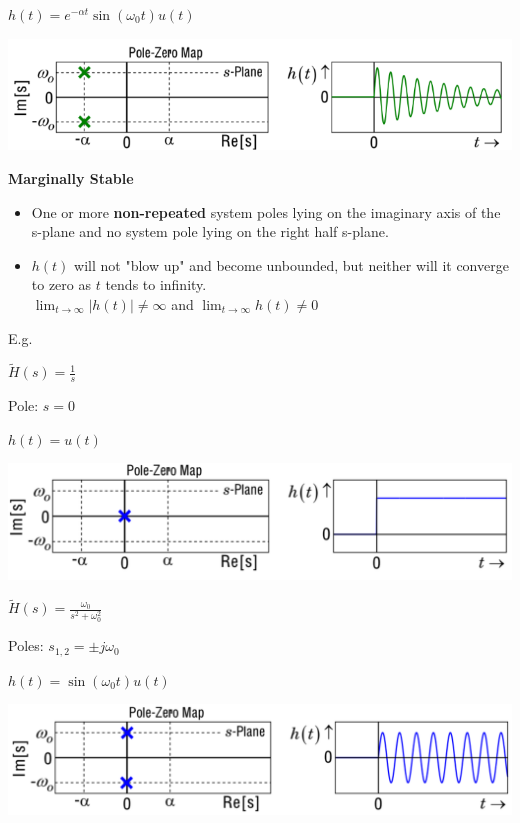 \documentclass[landscape,a4paper]{extarticle}
\newenvironment{Figure}
  {\par\medskip\noindent\minipage{\linewidth}}
  {\endminipage\par\medskip}
\begin{document}
\begin{multicols*}{5}
    $h(t) = e^{-\alpha t} \sin (\omega_0 t) u (t)$

    \begin{Figure}
        \centering
        \includegraphics[width=\linewidth]{biboStable2.png}        
    \end{Figure}

    \textbf{Marginally Stable}
    \begin{itemize}
        \item One or more \textbf{non-repeated} system poles lying on the imaginary axis of the s-plane and no system pole lying on the right half s-plane.
        \item $h(t)$ will not "blow up" and become unbounded, but neither will it converge to zero as $t$ tends to infinity.\\
        $\lim_{t \to \infty} |h(t)| \neq \infty$ and $\lim_{t \to \infty} h(t) \neq 0$
    \end{itemize}

    E.g.

    $\tilde{H}(s) = \frac{1}{s}$

    Pole: $s = 0$

    $h(t) = u(t)$
    \begin{Figure}
        \centering
        \includegraphics[width=\linewidth]{marginallyStable1.png}        
    \end{Figure}

    $\tilde{H}(s) = \frac{\omega_0}{s^2 + \omega_0^2}$

    Poles: $s_{1,2} = \pm j\omega_0$

    $h(t) = \sin (\omega_0 t) u (t)$

    \begin{Figure}
        \centering
        \includegraphics[width=\linewidth]{marginallyStable2.png}        
    \end{Figure}


\end{multicols*}
\end{document}
